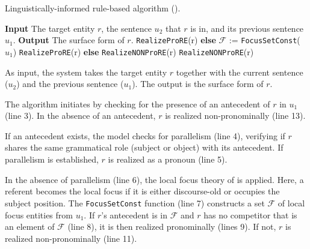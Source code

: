 \begin{algorithm}
	\caption{Linguistically-informed rule-based algorithm ().}
	\label{alg:rreg}
	\textbf{Input} The target entity $r$, the sentence $u_2$ that $r$ is in, and its previous sentence $u_1$.\;
	{\textbf{Output} The surface form of $r$.\;}{
		\;
		\;
		\hspace{1.5cm} \texttt{RealizeProRE}(r)\;
		\hspace{1cm} \textbf{else}\;
		\hspace{1.5cm}$\mathcal{F}$ $\texttt{:=}$ \texttt{FocusSetConst}($u_1$)\;
		\;
		\hspace{2cm} \texttt{RealizeProRE}(r)\;
		\hspace{1.5cm} \textbf{else}\;
		\hspace{2cm} \texttt{RealizeNONProRE}(r)\;
		\;
		\hspace{1cm} \texttt{RealizeNONProRE}(r)\;}
	
\end{algorithm}

As input, the system takes the target entity $r$ together with the current sentence ($u_2$) and the previous sentence ($u_1$). The output is the surface form of $r$.

The algorithm initiates by checking for the presence of an antecedent of $r$ in $u_1$ (line 3). In the absence of an antecedent, $r$ is realized non-pronominally (line 13). 

If an antecedent exists, the model checks for parallelism (line 4), verifying if $r$ shares the same grammatical role (subject or object) with its antecedent. If parallelism is established, $r$ is realized as a pronoun (line 5). 

In the absence of parallelism (line 6), the local focus theory of \citet{henschel2000pronominalization} is applied. Here, a referent becomes the local focus if it is either discourse-old or occupies the subject position. The \texttt{FocusSetConst} function (line 7) constructs a set $\mathcal{F}$ of local focus entities from $u_1$. If $r$'s antecedent is in $\mathcal{F}$ and $r$ has no competitor that is an element of $\mathcal{F}$ (line 8), it is then realized pronominally (lines 9). If not, $r$ is realized non-pronominally (line 11).


